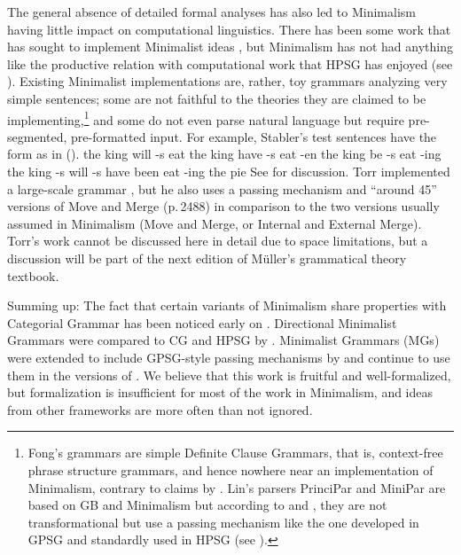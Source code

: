 \documentclass[output=paper
                ,modfonts
                ,nonflat
	        ,collection
	        ,collectionchapter
	        ,collectiontoclongg
 	        ,biblatex
                ,babelshorthands
                ,newtxmath
                ,draftmode
                ,colorlinks, citecolor=brown
]{./langsci/langscibook}
\begin{document}
The general absence of detailed formal analyses has also led to Minimalism having little impact on
computational linguistics. There has been some work that has sought to implement Minimalist ideas
\citep{Stabler2001a,FG2012a,Fong2014a}, but Minimalism has not had anything like the productive
relation with computational work that HPSG has enjoyed (see ). Existing Minimalist implementations are, rather, toy
grammars analyzing very simple sentences; some are not faithful to the theories they are claimed to
be implementing,\footnote{%
  Fong's grammars are simple Definite Clause Grammars, that is, context-free phrase structure grammars, and hence nowhere near an implementation of
  Minimalism, contrary to claims by \citet*[]{BPYC2011a}.
  Lin's parsers PrinciPar and MiniPar \citeyearpar{Lin93a,Lin2003a-u} are based on GB and Minimalism
  but according to \citet[]{Lin93a} and \citet[]{TSSC2019a}, they
  are not transformational but use a \slasch passing mechanism like the one developed in GPSG
  \citep{Gazdar81a} and standardly used in HPSG (see ).
} and some do not even parse natural language but require pre-segmented, pre-formatted
input. For example, Stabler's test sentences have the form as in ().
\eal
\ex the king will -s eat
\ex the king have -s eat -en
\ex the king be -s eat -ing
\ex the king -s will -s have been eat -ing the pie
\zl
See \citet[Section~4.7.2]{MuellerGT-Eng3} for discussion. Torr implemented a large-scale grammar
\citep[]{TSSC2019a}, but he also uses a \slasch passing mechanism and ``around 45''
versions of Move and Merge (p.\,2488) in comparison to the two versions usually assumed in
Minimalism (Move and Merge, or Internal and External Merge). Torr's work cannot be discussed here in 
detail due to space limitations, but a discussion will be part of the next edition of Müller's
grammatical theory textbook.


Summing up: The fact that certain variants of Minimalism share properties with Categorial Grammar
has been noticed early on \citep{BE95a}. Directional Minimalist Grammars were compared to CG and HPSG
by \citet{MuellerUnifying}. Minimalist Grammars (MGs) were extended to include GPSG-style \slasch passing mechanisms by
\citet{Kobele2008a} and continue to use them in the versions of \citet{TS2016a}. We believe that
this work is fruitful and well-formalized, but formalization is insufficient for most of the work in
Minimalism, and ideas from other frameworks are more often than not ignored.
\end{document}
